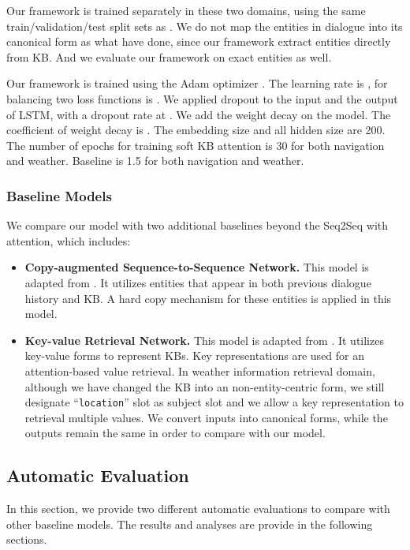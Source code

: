\documentclass[11pt]{article}
\begin{document}
Our framework is trained separately in these two domains, using the same train/validation/test split sets as . We do not map the entities in dialogue into its canonical form as what  have done, since our framework extract entities directly from KB. And we evaluate our framework on exact entities as well.

Our framework is trained using the Adam optimizer \cite{kingma-ba:2014:ICLR}. The learning rate is ,  for balancing two loss functions is . We applied dropout \cite{srivastava:2014:JMLR} to the input and the output of LSTM, with a dropout rate at . We add the weight decay on the model. The coefficient of weight decay is . The embedding size and all hidden size are 200. The number of epochs for training soft KB attention is 30 for both navigation and weather. Baseline  is 1.5 for both navigation and weather.
\subsubsection{Baseline Models}
We compare our model with two additional baselines beyond the Seq2Seq with attention, which includes:
\begin{itemize}
\item \textbf{Copy-augmented Sequence-to-Sequence Network.} This model is adapted from \cite{eric-manning:2017:EACL}. It utilizes entities that appear in both previous dialogue history and KB. A hard copy mechanism for these entities is applied in this model.
\item \textbf{Key-value Retrieval Network.} This model is adapted from . It utilizes key-value forms to represent KBs. Key representations are used for an attention-based value retrieval. In weather information retrieval domain, although we have changed the KB into an non-entity-centric form, we still designate ``\texttt{location}'' slot as subject slot and we allow a key representation to retrieval multiple values. We convert inputs into canonical forms, while the outputs remain the same in order to compare with our model.
\end{itemize}

\subsection{Automatic Evaluation}
In this section, we provide two different automatic evaluations to compare with other baseline models. The results and analyses are provide in the following sections.
\end{document}
